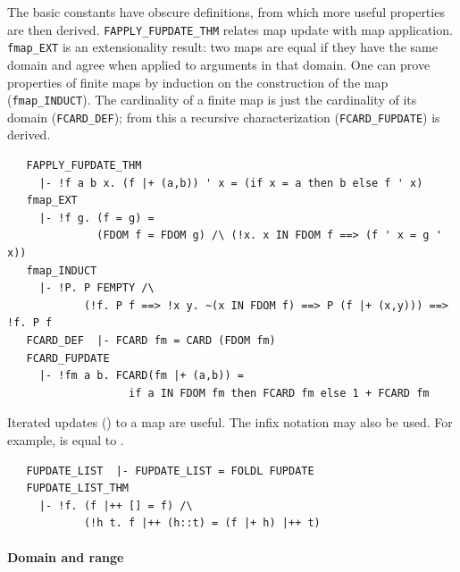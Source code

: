 {The basic constants have obscure definitions, from which more useful
properties are then derived. {\small\verb+FAPPLY_FUPDATE_THM+} relates
map update with map application.  {\small\verb+fmap_EXT+} is an
extensionality result: two maps are equal if they have the same domain
and agree when applied to arguments in that domain. One can prove
properties of finite maps by induction on the construction of the map
({\small\verb+fmap_INDUCT+}).  The cardinality of a finite map is
just the cardinality of its domain ({\small\verb+FCARD_DEF+}); from
this a recursive characterization ({\small\verb+FCARD_FUPDATE+}) is
derived.
\begin{hol}
\begin{verbatim}
   FAPPLY_FUPDATE_THM
     |- !f a b x. (f |+ (a,b)) ' x = (if x = a then b else f ' x)
   fmap_EXT
     |- !f g. (f = g) =
              (FDOM f = FDOM g) /\ (!x. x IN FDOM f ==> (f ' x = g ' x))
   fmap_INDUCT
     |- !P. P FEMPTY /\
            (!f. P f ==> !x y. ~(x IN FDOM f) ==> P (f |+ (x,y))) ==> !f. P f
   FCARD_DEF  |- FCARD fm = CARD (FDOM fm)
   FCARD_FUPDATE
     |- !fm a b. FCARD(fm |+ (a,b)) =
                   if a IN FDOM fm then FCARD fm else 1 + FCARD fm
\end{verbatim}
\end{hol}
Iterated updates () to a map are useful. The
infix notation \holtxt{|++} may also be used.  For example,  is equal to .
\begin{hol}
\begin{verbatim}
   FUPDATE_LIST  |- FUPDATE_LIST = FOLDL FUPDATE
   FUPDATE_LIST_THM
     |- !f. (f |++ [] = f) /\
            (!h t. f |++ (h::t) = (f |+ h) |++ t)
\end{verbatim}
\end{hol}


\paragraph {Domain and range}

}
